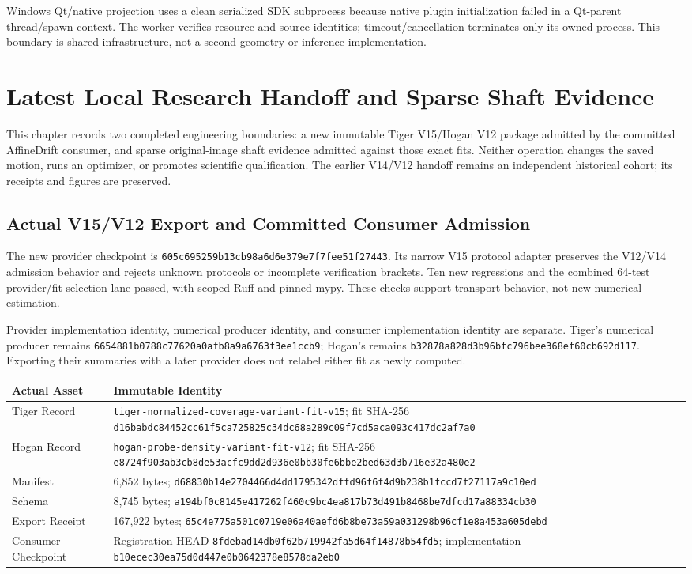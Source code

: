 \documentclass[11pt,letterpaper]{article}
\newcommand{\code}[1]{\nolinkurl{#1}}
\newcommand{\hash}[1]{{\footnotesize\nolinkurl{#1}}}
\newcommand{\reportsection}[1]{\section{#1}}
\begin{document}
Windows Qt/native projection uses a clean serialized SDK subprocess because
native plugin initialization failed in a Qt-parent thread/spawn context.
The worker verifies resource and source identities; timeout/cancellation
terminates only its owned process. This boundary is shared infrastructure,
not a second geometry or inference implementation.

\reportsection{Latest Local Research Handoff and Sparse Shaft Evidence}
\label{sec:latest-handoff-shaft}
This chapter records two completed engineering boundaries: a new immutable
Tiger V15/Hogan V12 package admitted by the committed AffineDrift consumer,
and sparse original-image shaft evidence admitted against those exact fits.
Neither operation changes the saved motion, runs an optimizer, or promotes
scientific qualification. The earlier V14/V12 handoff remains an independent
historical cohort; its receipts and figures are preserved.

\subsection{Actual V15/V12 Export and Committed Consumer Admission}
The new provider checkpoint is
\hash{605c695259b13cb98a6d6e379e7f7fee51f27443}. Its narrow V15 protocol
adapter preserves the V12/V14 admission behavior and rejects unknown protocols
or incomplete verification brackets. Ten new regressions and the combined
64-test provider/fit-selection lane passed, with scoped Ruff and pinned mypy.
These checks support transport behavior, not new numerical estimation.

Provider implementation identity, numerical producer identity, and consumer
implementation identity are separate. Tiger's numerical producer remains
\hash{6654881b0788c77620a0afb8a9a6763f3ee1ccb9}; Hogan's remains
\hash{b32878a828d3b96bfc796bee368ef60cb692d117}. Exporting their summaries
with a later provider does not relabel either fit as newly computed.

\begin{longtable}{@{}p{1.25in}p{5.05in}@{}}
\toprule Actual Asset & Immutable Identity\\\midrule\endhead
Tiger Record & \code{tiger-normalized-coverage-variant-fit-v15}; fit SHA-256
\hash{d16babdc84452cc61f5ca725825c34dc68a289c09f7cd5aca093c417dc2af7a0}\\
Hogan Record & \code{hogan-probe-density-variant-fit-v12}; fit SHA-256
\hash{e8724f903ab3cb8de53acfc9dd2d936e0bb30fe6bbe2bed63d3b716e32a480e2}\\
Manifest & 6,852 bytes;
\hash{d68830b14e2704466d4dd1795342dffd96f6f4d9b238b1fccd7f27117a9c10ed}\\
Schema & 8,745 bytes;
\hash{a194bf0c8145e417262f460c9bc4ea817b73d491b8468be7dfcd17a88334cb30}\\
Export Receipt & 167,922 bytes;
\hash{65c4e775a501c0719e06a40aefd6b8be73a59a031298b96cf1e8a453a605debd}\\
Consumer Checkpoint & Registration HEAD
\hash{8fdebad14db0f62b719942fa5d64f14878b54fd5}; implementation
\hash{b10ecec30ea75d0d447e0b0642378e8578da2eb0}\\
\bottomrule
\end{longtable}
\end{document}
